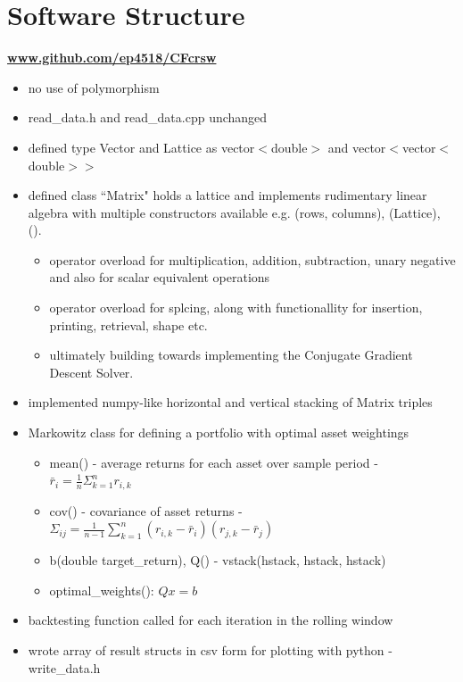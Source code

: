 \documentclass[12pt,twoside]{article}
\begin{document}


\section{Software Structure}
\textbf{\href{https://github.com/ep4518/CFcrsw}{www.github.com/ep4518/CFcrsw}}
\begin{itemize}[nosep]
    \item no use of polymorphism
    \item read\_data.h and read\_data.cpp unchanged
    \item defined type Vector and Lattice as vector$<$double$>$ and vector$<$vector$<$double$>$$>$
    \item defined class ``Matrix" holds a lattice and implements rudimentary linear algebra with multiple constructors available e.g. (rows, columns), (Lattice), ().
    \begin{itemize}[nosep]
        \item operator overload for multiplication, addition, subtraction, unary negative and also for scalar equivalent operations
        \item operator overload for splcing, along with functionallity for insertion, printing, retrieval, shape etc.
        \item ultimately building towards implementing the Conjugate Gradient Descent Solver.
    \end{itemize}
    \item implemented numpy-like horizontal and vertical stacking of Matrix triples
    \item Markowitz class for defining a portfolio with optimal asset weightings
    \begin{itemize}[nosep]
        \item mean() - average returns for each asset over sample period - $\bar{r}_i = \frac{1}{n}\Sigma_{k=1}^n r_{i,k} $
        \item cov() - covariance of asset returns - $\Sigma_{ij} = \frac{1}{n - 1}\sum_{k=1}^n (r_{i,k} - \bar{r}_i)(r_{j,k} - \bar{r}_j)$
        \item b(double target\_return), Q() - vstack(hstack, hstack, hstack)
        \item optimal\_weights(): $Q x = b$
    \end{itemize}
    \item backtesting function called for each iteration in the rolling window
    \item wrote array of result structs in csv form for plotting with python - write\_data.h
\end{itemize}
\end{document}
